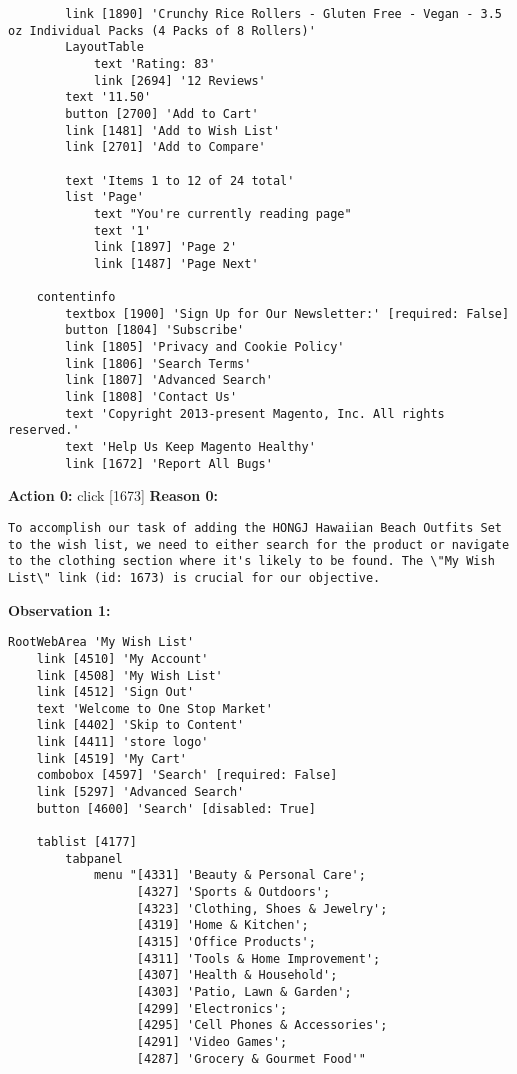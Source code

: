 \begin{tcolorbox}[breakable]
\begin{lstlisting}
        link [1890] 'Crunchy Rice Rollers - Gluten Free - Vegan - 3.5 oz Individual Packs (4 Packs of 8 Rollers)'
        LayoutTable
            text 'Rating: 83'
            link [2694] '12 Reviews'
        text '11.50'
        button [2700] 'Add to Cart'
        link [1481] 'Add to Wish List'
        link [2701] 'Add to Compare'

        text 'Items 1 to 12 of 24 total'
        list 'Page'
            text "You're currently reading page"
            text '1'
            link [1897] 'Page 2'
            link [1487] 'Page Next'

    contentinfo
        textbox [1900] 'Sign Up for Our Newsletter:' [required: False]
        button [1804] 'Subscribe'
        link [1805] 'Privacy and Cookie Policy'
        link [1806] 'Search Terms'
        link [1807] 'Advanced Search'
        link [1808] 'Contact Us'
        text 'Copyright 2013-present Magento, Inc. All rights reserved.'
        text 'Help Us Keep Magento Healthy'
        link [1672] 'Report All Bugs'
\end{lstlisting}
\textbf{Action 0:} click [1673]
\textbf{Reason 0:} 
\begin{lstlisting}
To accomplish our task of adding the HONGJ Hawaiian Beach Outfits Set to the wish list, we need to either search for the product or navigate to the clothing section where it's likely to be found. The \"My Wish List\" link (id: 1673) is crucial for our objective.
\end{lstlisting}

\textbf{Observation 1:} 
\begin{lstlisting}
RootWebArea 'My Wish List'
    link [4510] 'My Account'
    link [4508] 'My Wish List'
    link [4512] 'Sign Out'
    text 'Welcome to One Stop Market'
    link [4402] 'Skip to Content'
    link [4411] 'store logo'
    link [4519] 'My Cart'
    combobox [4597] 'Search' [required: False]
    link [5297] 'Advanced Search'
    button [4600] 'Search' [disabled: True]

    tablist [4177]
        tabpanel
            menu "[4331] 'Beauty & Personal Care'; 
                  [4327] 'Sports & Outdoors'; 
                  [4323] 'Clothing, Shoes & Jewelry'; 
                  [4319] 'Home & Kitchen'; 
                  [4315] 'Office Products'; 
                  [4311] 'Tools & Home Improvement'; 
                  [4307] 'Health & Household'; 
                  [4303] 'Patio, Lawn & Garden'; 
                  [4299] 'Electronics'; 
                  [4295] 'Cell Phones & Accessories'; 
                  [4291] 'Video Games'; 
                  [4287] 'Grocery & Gourmet Food'"


\end{lstlisting}
\end{tcolorbox}
